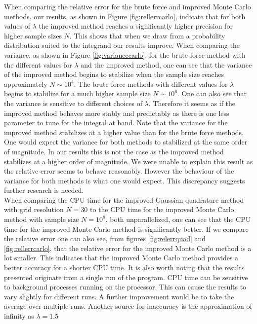 \documentclass[10pt, twocolumn]{aastex62}
\begin{document}
When comparing the relative error for the brute force and improved Monte Carlo
methods, our results, as shown in Figure \ref{fig:rellerrcarlo}, indicate that
for both values of $\lambda$ the improved method reaches a significantly higher
precision for higher sample sizes $N$. This shows that when we draw from a
probability distribution suited to the integrand our results improve. When
comparing the variance, as shown in Figure \ref{fig:variancecarlo}, for the
brute force method with the different values for $\lambda$ and the improved
method, one can see that the variance of the improved method begins to stabilize
when the sample size reaches approximately $N\sim10^4$. The brute force methods
with different values for $\lambda$ begins to stabilize for a much higher sample
size $N\sim10^6$. One can also see that the variance is sensitive to different
choices of $\lambda$. Therefore it seems as if the improved method behaves more
stably and predictably as there is one less parameter to tune for the integral
at hand. Note that the variance for the improved method stabilizes at a higher
value than for the brute force methods. One would expect the variance for both
methods to stabilized at the same order of magnitude. In our results this is not
the case as the improved method stabilizes at a higher order of magnitude. We
were unable to explain this result as the relative error seems to behave
reasonably. However the behaviour of the variance for both methods is what one
would expect. This discrepancy suggests further research is needed.\\\indent
When comparing the CPU time for the improved Gaussian quadrature method with
grid resolution $N=30$ to the CPU time for the improved Monte Carlo method with
sample size $N=10^8$, both unparallelized, one can see that the CPU time for the
improved Monte Carlo method is significantly better. If we compare the relative
error one can also see, from figures \ref{fig:relerrquad} and
\ref{fig:rellerrcarlo}, that the relative error for the improved Monte Carlo
method is a lot smaller. This indicates that the improved Monte Carlo method
provides a better accuracy for a shorter CPU time. It is also worth noting that
the results presented originate from a single run of the program. CPU time can
be sensitive to background processes running on the processor. This can cause
the results to vary slightly for different runs. A further improvement would be
to take the average over multiple runs. Another source for inaccuracy is the
approximation of infinity as $\lambda = 1.5$\\\indent
\end{document}
